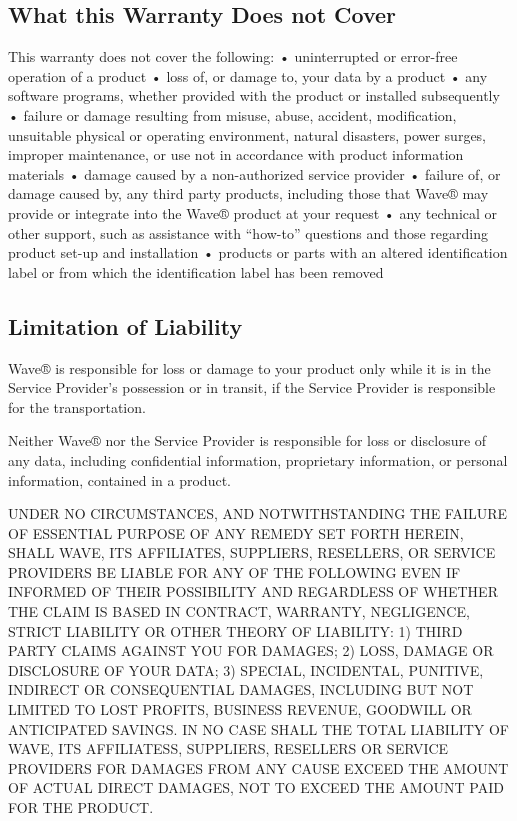 \documentclass[letterpaper,10pt,english]{sphinxmanual}
\begin{document}
\subsection{What this Warranty Does not Cover}
\label{\detokenize{part1:what-this-warranty-does-not-cover}}
This warranty does not cover the following:
• uninterrupted or error-free operation of a product
• loss of, or damage to, your data by a product
• any software programs, whether provided with the product or installed subsequently
• failure or damage resulting from misuse, abuse, accident, modification, unsuitable physical or operating environment, natural disasters, power surges, improper maintenance, or use not in accordance with product information materials
• damage caused by a non-authorized service provider
• failure of, or damage caused by, any third party products, including those that Wave® may provide or integrate into the Wave® product at your request
• any technical or other support, such as assistance with “how-to” questions and those regarding product set-up and installation
• products or parts with an altered identification label or from which the identification label has been removed


\subsection{Limitation of Liability}
\label{\detokenize{part1:limitation-of-liability}}
Wave® is responsible for loss or damage to your product only while it is in the Service Provider’s possession or in transit, if the Service Provider is responsible for the transportation.

Neither Wave® nor the Service Provider is responsible for loss or disclosure of any data, including confidential information, proprietary information, or personal information, contained in a product.

UNDER NO CIRCUMSTANCES, AND NOTWITHSTANDING THE FAILURE OF ESSENTIAL PURPOSE OF ANY REMEDY SET FORTH HEREIN, SHALL WAVE, ITS AFFILIATES, SUPPLIERS, RESELLERS, OR SERVICE PROVIDERS BE LIABLE FOR ANY OF THE FOLLOWING EVEN IF INFORMED OF THEIR POSSIBILITY AND REGARDLESS OF WHETHER THE CLAIM IS BASED IN CONTRACT, WARRANTY, NEGLIGENCE, STRICT LIABILITY OR OTHER THEORY OF LIABILITY: 1) THIRD PARTY CLAIMS AGAINST YOU FOR DAMAGES; 2) LOSS, DAMAGE OR DISCLOSURE OF YOUR DATA; 3) SPECIAL, INCIDENTAL, PUNITIVE, INDIRECT OR CONSEQUENTIAL DAMAGES, INCLUDING BUT NOT LIMITED TO LOST PROFITS, BUSINESS REVENUE, GOODWILL OR ANTICIPATED SAVINGS. IN NO CASE SHALL THE TOTAL LIABILITY OF WAVE, ITS AFFILIATESS, SUPPLIERS, RESELLERS OR SERVICE PROVIDERS FOR DAMAGES FROM ANY CAUSE EXCEED THE AMOUNT OF ACTUAL DIRECT DAMAGES, NOT TO EXCEED THE AMOUNT PAID FOR THE PRODUCT.
\end{document}
